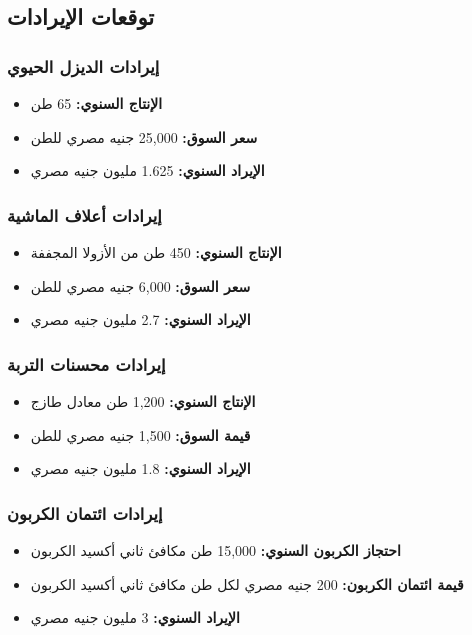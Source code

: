 \subsection{توقعات الإيرادات}

\subsubsection{إيرادات الديزل الحيوي}
\begin{itemize}
    \item \textbf{الإنتاج السنوي:} 65 طن
    \item \textbf{سعر السوق:} 25,000 جنيه مصري للطن
    \item \textbf{الإيراد السنوي:} 1.625 مليون جنيه مصري
\end{itemize}

\subsubsection{إيرادات أعلاف الماشية}
\begin{itemize}
    \item \textbf{الإنتاج السنوي:} 450 طن من الأزولا المجففة
    \item \textbf{سعر السوق:} 6,000 جنيه مصري للطن
    \item \textbf{الإيراد السنوي:} 2.7 مليون جنيه مصري
\end{itemize}

\subsubsection{إيرادات محسنات التربة}
\begin{itemize}
    \item \textbf{الإنتاج السنوي:} 1,200 طن معادل طازج
    \item \textbf{قيمة السوق:} 1,500 جنيه مصري للطن
    \item \textbf{الإيراد السنوي:} 1.8 مليون جنيه مصري
\end{itemize}

\subsubsection{إيرادات ائتمان الكربون}
\begin{itemize}
    \item \textbf{احتجاز الكربون السنوي:} 15,000 طن مكافئ ثاني أكسيد الكربون
    \item \textbf{قيمة ائتمان الكربون:} 200 جنيه مصري لكل طن مكافئ ثاني أكسيد الكربون
    \item \textbf{الإيراد السنوي:} 3 مليون جنيه مصري
\end{itemize}

